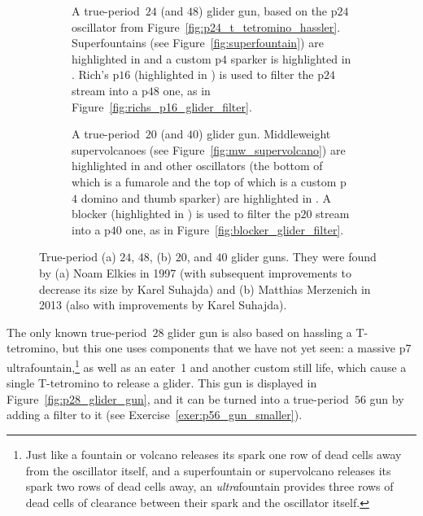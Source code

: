 \begin{figure}[!htb]
	\centering
	\begin{subfigure}{0.41\textwidth}
		\centering
		\caption{A true-period~$24$ (and $48$) glider gun, based on the p$24$ oscillator from Figure~\ref{fig:p24_t_tetromino_hassler}. Superfountains (see Figure~\ref{fig:superfountain}) are highlighted in  and a custom p$4$ sparker is highlighted in . Rich's p$16$ (highlighted in ) is used to filter the p$24$ stream into a p$48$ one, as in Figure~\ref{fig:richs_p16_glider_filter}.}
		\label{fig:p24_glider_gun}
	\end{subfigure} \hfill \begin{subfigure}{0.56\textwidth}
		\centering\vspace*{0.15cm}
		\caption{A true-period~$20$ (and $40$) glider gun. Middleweight supervolcanoes (see Figure~\ref{fig:mw_supervolcano}) are highlighted in  and other oscillators (the bottom of which is a fumarole and the top of which is a custom p$4$ domino and thumb sparker) are highlighted in . A blocker (highlighted in ) is used to filter the p$20$ stream into a p$40$ one, as in Figure~\ref{fig:blocker_glider_filter}.}
		\label{fig:p20_glider_gun}
	\end{subfigure}
	\caption{True-period (a) $24$, $48$, (b) $20$, and $40$ glider guns. They were found by (a) Noam Elkies in 1997 (with subsequent improvements to decrease its size by Karel Suhajda) and (b) Matthias Merzenich in 2013 (also with improvements by Karel Suhajda).}\label{fig:p20_24_guns}
\end{figure}

The only known true-period~$28$ glider gun is also based on hassling a T-tetromino, but this one uses components that we have not yet seen: a massive p7 ultrafountain,\footnote{Just like a fountain or volcano releases its spark one row of dead cells away from the oscillator itself, and a superfountain or supervolcano releases its spark two rows of dead cells away, an \emph{ultra}fountain provides three rows of dead cells of clearance between their spark and the oscillator itself.} as well as an eater~1 and another custom still life, which cause a single T-tetromino to release a glider. This gun is displayed in Figure~\ref{fig:p28_glider_gun}, and it can be turned into a true-period~$56$ gun by adding a filter to it (see Exercise~\ref{exer:p56_gun_smaller}).

